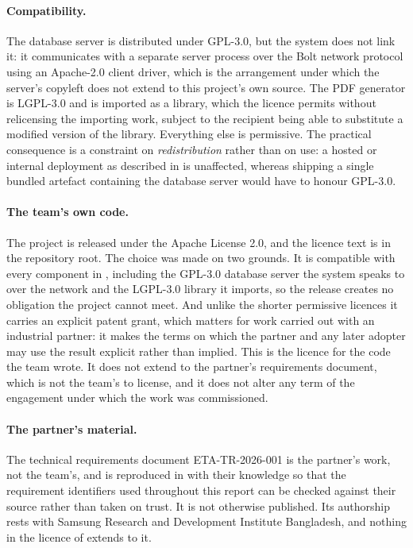 \paragraph{Compatibility.} The database server is distributed under GPL-3.0,
but the system does not link it: it communicates with a separate server process
over the Bolt network protocol using an Apache-2.0 client driver, which is the
arrangement under which the server's copyleft does not extend to this
project's own source. The PDF generator is LGPL-3.0 and is imported as a
library, which the licence permits without relicensing the importing work,
subject to the recipient being able to substitute a modified version of the
library. Everything else is permissive. The practical consequence is a
constraint on \emph{redistribution} rather than on use: a hosted or internal
deployment as described in  is unaffected, whereas
shipping a single bundled artefact containing the database server would have to
honour GPL-3.0.

\paragraph{The team's own code.} The project is released under the Apache
License 2.0, and the licence text is in the repository root. The choice was
made on two grounds. It is compatible with every component in
, including the GPL-3.0 database server the system speaks to
over the network and the LGPL-3.0 library it imports, so the release creates no
obligation the project cannot meet. And unlike the shorter permissive licences
it carries an explicit patent grant, which matters for work carried out with an
industrial partner: it makes the terms on which the partner and any later
adopter may use the result explicit rather than implied. This is the licence
for the code the team wrote. It does not extend to the partner's requirements
document, which is not the team's to license, and it does not alter any term of
the engagement under which the work was commissioned.

\paragraph{The partner's material.} The technical requirements document
ETA-TR-2026-001 is the partner's work, not the team's, and is reproduced in
 with their knowledge so that the requirement identifiers used
throughout this report can be checked against their source rather than taken on
trust. It is not otherwise published. Its authorship rests with Samsung
Research and Development Institute Bangladesh, and nothing in the licence of
 extends to it.

